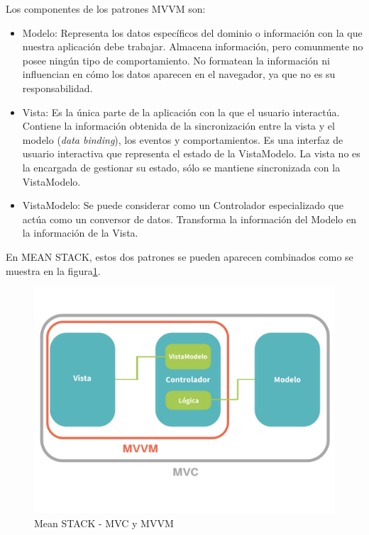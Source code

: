 Los componentes de los patrones MVVM son:


\begin{itemize}
\item Modelo: Representa los datos específicos del dominio o información con la que nuestra aplicación debe trabajar. Almacena información, pero comunmente no posee ningún tipo de comportamiento. No formatean la información ni influencian en cómo los datos aparecen en el navegador, ya que no es su responsabilidad.
\item Vista: Es la única parte de la aplicación con la que el usuario interactúa. Contiene la información obtenida de la sincronización entre la vista y el modelo (\textit{data binding}\cite{data_binding_w3s}), los eventos y comportamientos. Es una interfaz de usuario interactiva que representa el estado de la VistaModelo. La vista no es la encargada de gestionar su estado, sólo se mantiene sincronizada con la VistaModelo.
\item VistaModelo: Se puede considerar como un Controlador especializado que actúa como un conversor de datos. Transforma la información del Modelo en la información de la Vista\cite{fernandomonteiro2014}. 
\end{itemize}

En MEAN STACK, estos dos patrones se pueden aparecen combinados como se muestra en la figura\ref{fig:mvc_mvvm}.


\begin{figure}[htbp] 
    \centering
    \includegraphics[width=1\textwidth]{figuras/MVC_MVVM.png}
    \caption{Mean STACK - MVC y MVVM}
    \label{fig:mvc_mvvm}
\end{figure}	


